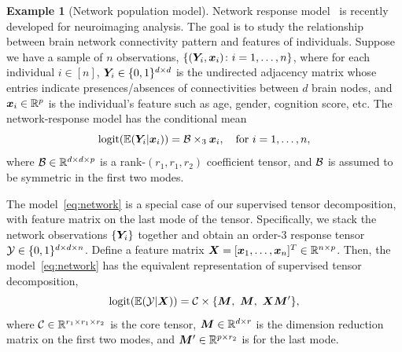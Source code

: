 \documentclass[12pt]{article}
\theoremstyle{definition}
\theoremstyle{definition}
\newtheorem{example}{Example}
\begin{document}
\begin{example}[Network population model]\label{example:brain}
Network response model~\citep{rabusseau2016low} is recently developed for neuroimaging analysis. The goal is to study the relationship between brain network connectivity pattern and features of individuals. Suppose we have a sample of $n$ observations, $\{(\bm Y_i, \bm x_i)\colon i=1,\ldots,n\}$, where for each individual $i\in[n]$, $\bm Y_i\in\{0,1\}^{d\times d}$ is the undirected adjacency matrix whose entries indicate presences/absences of connectivities between $d$ brain nodes, and $\bm x_i\in\mathbb{R}^p$ is the individual's feature such as age, gender, cognition score, etc. The network-response model  has the conditional mean
\begin{equation}\label{eq:network}
\textup{logit}(\mathbb{E}(\bm Y_i|\bm x_i))=\mathcal{B}\times_3\bm x_i, \quad \text{for }i=1,\ldots,n,
\end{equation}
where $\mathcal{B}\in \mathbb{R}^{d\times d\times p}$ is a rank-$(r_1,r_1,r_2)$ coefficient tensor, and $\mathcal{B}$ is assumed to be symmetric in the first two modes.  

The model~\eqref{eq:network} is a special case of our supervised tensor decomposition, with feature matrix on the last mode of the tensor. Specifically, we stack the network observations $\{\bm Y_i\}$ together and obtain an order-3 response tensor $\mathcal{Y}\in\{0,1\}^{d\times d\times n}$. Define a feature matrix $\bm X=[\bm x_1,\ldots,\bm x_n]^T\in\mathbb{R}^{n\times p}$. Then, the model~\eqref{eq:network} has the equivalent representation of supervised tensor decomposition,
\[
\textup{logit}(\mathbb{E}(\tY|\mX))=\tC\times\{\mM,\ \mM,\ \mX\mM'\},
\]
where $\mathcal{C}\in\mathbb{R}^{r_1\times r_1\times r_2}$ is the core tensor, $\bm M\in\mathbb{R}^{d\times r}$ is the dimension reduction matrix on the first two modes, and $\bm M'\in\mathbb{R}^{p\times r_2}$ is for the last mode.  \end{example}
 
\end{document}
